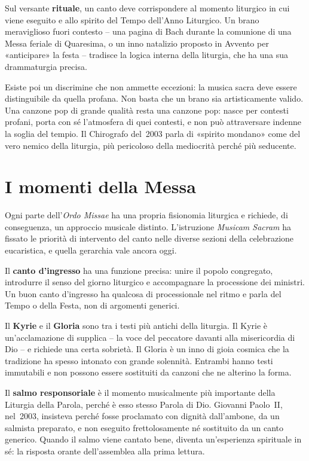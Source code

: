 \documentclass[12pt,a4paper]{article}
\begin{document}
	Sul versante \textbf{rituale}, un canto deve corrispondere al momento liturgico
	in cui viene eseguito e allo spirito del Tempo dell'Anno Liturgico. Un brano
	meraviglioso fuori contesto -- una pagina di Bach durante la comunione di una
	Messa feriale di Quaresima, o un inno natalizio proposto in Avvento per
	«anticipare» la festa -- tradisce la logica interna della liturgia, che ha una
	sua drammaturgia precisa.
	
	Esiste poi un discrimine che non ammette eccezioni: la musica sacra deve essere
	distinguibile da quella profana. Non basta che un brano sia artisticamente
	valido. Una canzone pop di grande qualità resta una canzone pop: nasce per
	contesti profani, porta con sé l'atmosfera di quei contesti, e non può
	attraversare indenne la soglia del tempio. Il Chirografo del~2003 parla di
	«spirito mondano» come del vero nemico della liturgia, più pericoloso della
	mediocrità perché più seducente.
	
	\section{I momenti della Messa}
	
	Ogni parte dell'\emph{Ordo Missae} ha una propria fisionomia liturgica e
	richiede, di conseguenza, un approccio musicale distinto. L'istruzione
	\emph{Musicam Sacram} ha fissato le priorità di intervento del canto nelle
	diverse sezioni della celebrazione eucaristica, e quella gerarchia vale ancora
	oggi.
	
	Il \textbf{canto d'ingresso} ha una funzione precisa: unire il popolo
	congregato, introdurre il senso del giorno liturgico e accompagnare la
	processione dei ministri. Un buon canto d'ingresso ha qualcosa di processionale
	nel ritmo e parla del Tempo o della Festa, non di argomenti generici.
	
	Il \textbf{Kyrie} e il \textbf{Gloria} sono tra i testi più antichi della
	liturgia. Il Kyrie è un'acclamazione di supplica -- la voce del peccatore
	davanti alla misericordia di Dio -- e richiede una certa sobrietà. Il Gloria è
	un inno di gioia cosmica che la tradizione ha spesso intonato con grande
	solennità. Entrambi hanno testi immutabili e non possono essere sostituiti da
	canzoni che ne alterino la forma.
	
	Il \textbf{salmo responsoriale} è il momento musicalmente più importante della
	Liturgia della Parola, perché è esso stesso Parola di Dio. Giovanni Paolo~II,
	nel~2003, insisteva perché fosse proclamato con dignità dall'ambone, da un
	salmista preparato, e non eseguito frettolosamente né sostituito da un canto
	generico. Quando il salmo viene cantato bene, diventa un'esperienza spirituale in
	sé: la risposta orante dell'assemblea alla prima lettura.
	
\end{document}

